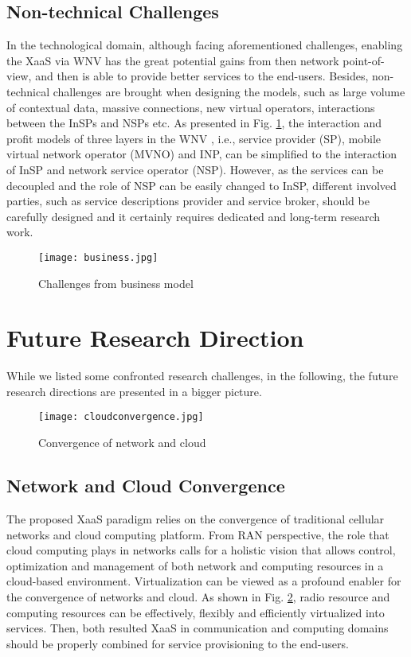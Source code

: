 \documentclass[12pt,draftclsnofoot,onecolumn]{IEEEtran}
\begin{document}
\subsection{Non-technical Challenges}
In the technological domain, although facing aforementioned
challenges, enabling the XaaS via WNV has the great potential
gains from then network point-of-view, and then is able to provide
better services to the end-users. Besides, non-technical
challenges are brought when designing the models, such as large
volume of contextual data, massive connections, new virtual
operators, interactions between the InSPs and NSPs etc. As
presented in Fig. \ref{fig:business}, the interaction and profit
models of three layers in the WNV \cite{Liang}, i.e., service
provider (SP), mobile virtual network operator (MVNO) and INP, can
be simplified to the interaction of InSP and network service
operator (NSP). However, as the services can be decoupled and the
role of NSP can be easily changed to InSP, different involved
parties, such as service descriptions provider and service broker,
should be carefully designed and it certainly requires dedicated
and long-term research work.

\begin{figure}[t]
\centering
\texttt{[image: business.jpg]}
\caption{Challenges from business model} \label{fig:business}
\end{figure}
\section{Future Research Direction}
While we listed some confronted research challenges, in the
following, the future research directions are presented in a
bigger picture.

\begin{figure}[t]
\centering
\texttt{[image: cloudconvergence.jpg]}
\caption{Convergence of network and cloud}
\label{fig:cloudconvergence}
\end{figure}

\subsection{Network and Cloud Convergence}
The proposed XaaS paradigm relies on the convergence of
traditional cellular networks and cloud computing platform. From
RAN perspective, the role that cloud computing plays in networks
calls for a holistic vision that allows control, optimization and
management of both network and computing resources in a
cloud-based environment. Virtualization can be viewed as a
profound enabler for the convergence of networks and cloud. As
shown in Fig. \ref{fig:cloudconvergence}, radio resource and
computing resources can be effectively, flexibly and efficiently
virtualized into services. Then, both resulted XaaS in
communication and computing domains should be properly combined
for service provisioning to the end-users. \par
\end{document}

